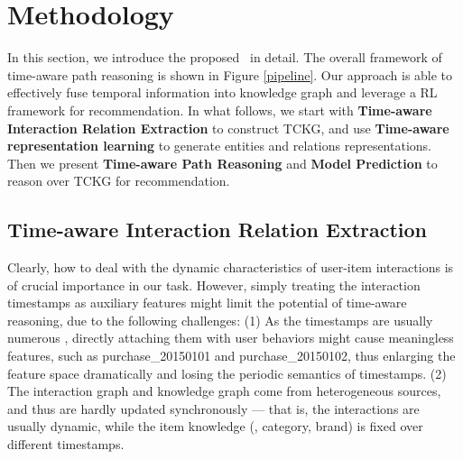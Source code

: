 \section{Methodology}
\label{sec:method}


%
In this section, we introduce the proposed \tkgrec\ in detail.
The overall framework of time-aware path reasoning is shown in Figure 
\ref{pipeline}.
%
Our approach is able to effectively fuse temporal information into knowledge 
graph and leverage a RL framework for recommendation.
In what follows, we start with 
\textbf{Time-aware Interaction Relation Extraction} 
to construct TCKG, and use \textbf{Time-aware representation learning} 
to generate entities and relations representations.
Then we present \textbf{Time-aware Path Reasoning} and \textbf{Model Prediction} to reason over TCKG for recommendation.




\subsection{Time-aware Interaction Relation Extraction}\label{tire}
Clearly, how to deal with the dynamic characteristics of user-item interactions is of crucial importance in our task.
However, simply treating the interaction timestamps as auxiliary features might limit the potential of time-aware reasoning, due to the following challenges:
(1) As the timestamps are usually numerous \cite{datasetAmazon}, directly attaching them with user behaviors might cause meaningless features, such as purchase\_20150101 and purchase\_20150102, thus enlarging the feature space dramatically and losing the periodic semantics of timestamps.
(2) The interaction graph and knowledge graph come from heterogeneous sources, and thus are hardly updated synchronously --- that is, the interactions are usually dynamic, while the item knowledge (\eg, category, brand) is fixed over different timestamps.

